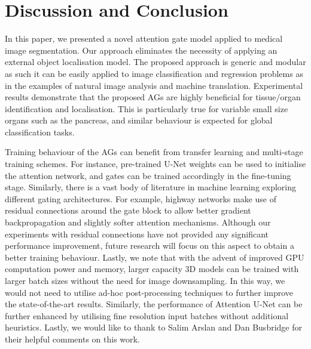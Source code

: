 \documentclass{article}
\begin{document}
\section{Discussion and Conclusion}

In this paper, we presented a novel attention gate model applied to medical image segmentation. Our approach eliminates the necessity of applying an external object localisation model. The proposed approach is generic and modular as such it can be easily applied to image classification and regression problems as in the examples of natural image analysis and machine translation. Experimental results demonstrate that the proposed AGs are highly beneficial for tissue/organ identification and localisation. This is particularly true for variable small size organs such as the pancreas, and similar behaviour is expected for global classification tasks. 

Training behaviour of the AGs can benefit from transfer learning and multi-stage training schemes. For instance, pre-trained U-Net weights can be used to initialise the attention network, and gates can be trained accordingly in the fine-tuning stage. Similarly, there is a vast body of literature in machine learning exploring different gating architectures. For example, highway networks \cite{greff2016highway} make use of residual connections around the gate block to allow better gradient backpropagation and slightly softer attention mechanisms. Although our experiments with residual connections have not provided any significant performance improvement, future research will focus on this aspect to obtain a better training behaviour. Lastly, we note that with the advent of improved GPU computation power and memory, larger capacity 3D models can be trained with larger batch sizes without the need for image downsampling. In this way, we would not need to utilise ad-hoc post-processing techniques to further improve the state-of-the-art results. Similarly, the performance of Attention U-Net can be further enhanced by utilising fine resolution input batches without additional heuristics. Lastly, we would like to thank to Salim Arslan and Dan Busbridge for their helpful comments on this work. 



\end{document}

